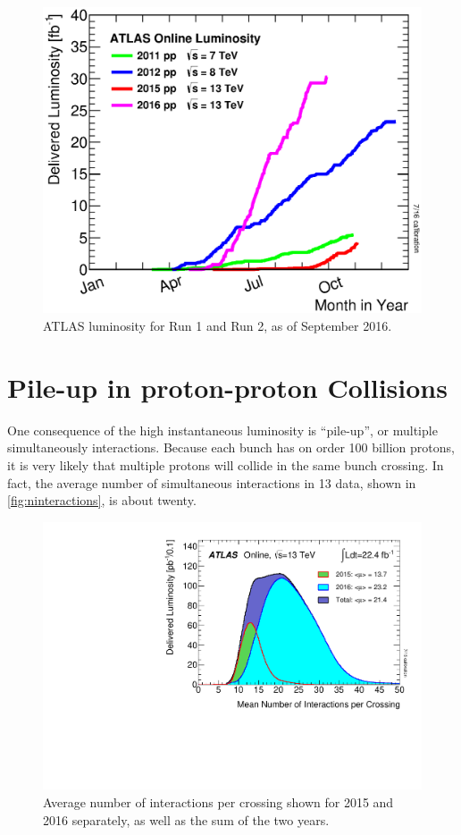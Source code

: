 \begin{centering}
\begin{figure}[!hbt]
\myfloatalign
\includegraphics[width=.90\linewidth]{figures/lhc/intlumivsyear.eps}
\caption{ATLAS luminosity for Run 1 and Run 2, as of September 2016.}
\label{fig:lumi_vs_year}
\end{figure} 
\end{centering}

\section{Pile-up in proton-proton Collisions}
\label{sec:pileup}

One consequence of the high instantaneous luminosity is ``pile-up'', or multiple simultaneously interactions. Because each bunch has on order 100 billion protons, it is very likely that multiple protons will collide in the same bunch crossing. In fact, the average number of simultaneous interactions in 13 \tev data, shown in \autoref{fig:ninteractions}, is about twenty. 

\begin{centering}
\begin{figure}[!hbt]
\myfloatalign
\includegraphics[width=.85\linewidth]{figures/atlas/mu_2015_2016_ICHEP.pdf}
\caption{Average number of interactions per crossing shown for 2015 and 2016 separately, as well as the sum of the two years.}
\label{fig:ninteractions}
\end{figure}
\end{centering}

